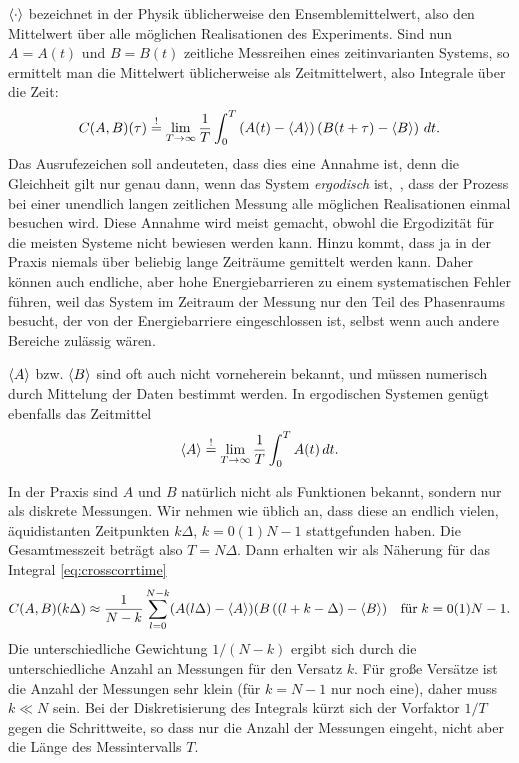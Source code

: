 $\left\langle{\cdot}\right\rangle$ bezeichnet in der Physik üblicherweise den
Ensemblemittelwert, also den Mittelwert über alle möglichen
Realisationen des Experiments. Sind nun $A=A(t)$ und $B=B(t)$
zeitliche Messreihen eines zeitinvarianten Systems, so ermittelt man
die Mittelwert üblicherweise als Zeitmittelwert, also Integrale über
die Zeit:
\begin{equation}
  \label{eq:crosscorrtime}
  C(A,B)(\tau) \stackrel{!}{=}
  \lim_{T\to\infty}\frac{1}{T}\int_{0}^{T} \left(A(t)-\left\langle{A}\right\rangle\right)\left(B(t+\tau)-\left\langle{B}\right\rangle\right)\,dt.
\end{equation}
Das Ausrufezeichen soll andeuteten, dass dies eine Annahme ist, denn
die Gleichheit gilt nur genau dann, wenn das System \emph{ergodisch}
ist, \dh\,, dass der Prozess bei einer unendlich langen zeitlichen
Messung alle möglichen Realisationen einmal besuchen wird. Diese
Annahme wird meist gemacht, obwohl die Ergodizität für die meisten
Systeme nicht bewiesen werden kann. Hinzu kommt, dass ja in der Praxis
niemals über beliebig lange Zeiträume gemittelt werden kann. Daher
können auch endliche, aber hohe Energiebarrieren zu einem
systematischen Fehler führen, weil das System im Zeitraum der Messung
nur den Teil des Phasenraums besucht, der von der Energiebarriere
eingeschlossen ist, selbst wenn auch andere Bereiche zulässig wären.

$\left\langle{A}\right\rangle$ bzw. $\left\langle{B}\right\rangle$ sind oft auch nicht vorneherein bekannt, und
müssen numerisch durch Mittelung der Daten bestimmt
werden. In ergodischen Systemen genügt ebenfalls das Zeitmittel 
\begin{equation}
  \left\langle{A}\right\rangle \stackrel{!}{=}
  \lim_{T\to\infty}\frac{1}{T}\int_{0}^{T} A(t)\,dt.
\end{equation}

In der Praxis sind $A$ und $B$ natürlich nicht als Funktionen bekannt,
sondern nur als diskrete Messungen. Wir nehmen wie üblich an, dass
diese an endlich vielen, äquidistanten Zeitpunkten $k\Delta$,
$k=0(1)N-1$ stattgefunden haben. Die Gesamtmesszeit beträgt also
$T=N\Delta$. Dann erhalten wir als Näherung für das Integral \eqref{eq:crosscorrtime}
\begin{equation}
  \label{eq:crosscorrnum}
  C(A,B)(k\Delta)\approx
  \frac{1}{N-k}\sum_{l=0}^{N-k}(A(l\Delta)-\left\langle{A}\right\rangle)(B\left((l+k-\Delta\right)-\left\langle{B}\right\rangle)
  \quad\text{für}\; k=0(1)N-1.
\end{equation}
Die unterschiedliche Gewichtung $1/(N-k)$ ergibt sich durch die
unterschiedliche Anzahl an Messungen für den Versatz $k$. Für große
Versätze ist die Anzahl der Messungen sehr klein (für $k=N-1$ nur noch
eine), daher muss $k \ll N$ sein. Bei der Diskretisierung des
Integrals kürzt sich der Vorfaktor $1/T$ gegen die Schrittweite, so
dass nur die Anzahl der Messungen eingeht, nicht aber die Länge des
Messintervalls $T$.

